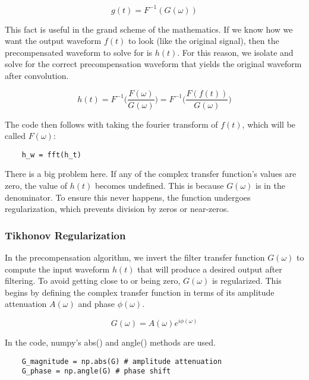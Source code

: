 \documentclass[11pt, a4paper]{article}
\theoremstyle{definition}
\numberwithin{equation}{section}
\begin{document}
\begin{equation}
    g(t) = F^{-1}(G(\omega))
\end{equation}

This fact is useful in the grand scheme of the mathematics. If we know how we want the output waveform $f(t)$ to look (like the original signal), then the precompensated waveform to solve for is $h(t)$. For this reason, we isolate and solve for the correct precompensation waveform that yields the original waveform after convolution.

\begin{equation}
    h(t) = F^{-1}\biggr(\frac{F(\omega)}{G(\omega)}\biggr) = F^{-1} \biggr(\frac{F(f(t))}{G(\omega)}\biggr)
\end{equation}

The code then follows with taking the fourier transform of $f(t)$, which will be called $F(\omega)$:

\begin{verbatim}
    h_w = fft(h_t)
\end{verbatim}

There is a big problem here. If any of the complex transfer function's values are zero, the value of $h(t)$ becomes undefined. This is because $G(\omega)$ is in the denominator. To ensure this never happens, the function undergoes regularization, which prevents division by zeros or near-zeros.

\subsubsection{Tikhonov Regularization}

In the precompensation algorithm, we invert the filter transfer function $G(\omega)$ to compute the input waveform $h(t)$ that will produce a desired output after filtering. To avoid getting close to or being zero, $G(\omega)$ is regularized. This begins by defining the complex transfer function in terms of its amplitude attenuation $A(\omega)$ and phase $\phi(\omega)$.

\begin{equation}
    G(\omega) = A(\omega)e^{i \phi(\omega)}
\end{equation}

In the code, numpy's abs() and angle() methods are used.

\begin{verbatim}
    G_magnitude = np.abs(G) # amplitude attenuation
    G_phase = np.angle(G) # phase shift
\end{verbatim}
\end{document}
